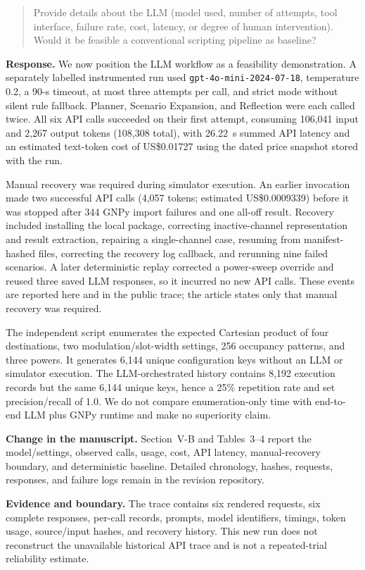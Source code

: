 \documentclass[11pt]{article}
\newenvironment{reviewercomment}{\begin{quote}\color{reviewblue}}{\end{quote}}
\newenvironment{authorresponse}{\color{responsegreen}\textbf{Response.} }{\par\color{black}}
\newcommand{\change}[1]{\par\textbf{Change in the manuscript.} #1\par}
\newcommand{\evidence}[1]{\par\textbf{Evidence and boundary.} #1\par}
\begin{document}
\begin{reviewercomment}
\textbullet{} Provide details about the LLM (model used, number of attempts, tool interface, failure rate, cost, latency, or degree of human intervention). Would it be feasible a conventional scripting pipeline as baseline?
\end{reviewercomment}
\begin{authorresponse}
We now position the LLM workflow as a feasibility demonstration. A separately labelled instrumented run used \texttt{gpt-4o-mini-2024-07-18}, temperature 0.2, a 90-s timeout, at most three attempts per call, and strict mode without silent rule fallback. Planner, Scenario Expansion, and Reflection were each called twice. All six API calls succeeded on their first attempt, consuming 106,041 input and 2,267 output tokens (108,308 total), with 26.22~s summed API latency and an estimated text-token cost of US\$0.01727 using the dated price snapshot stored with the run.

Manual recovery was required during simulator execution. An earlier invocation made two successful API calls (4,057 tokens; estimated US\$0.0009339) before it was stopped after 344 GNPy import failures and one all-off result. Recovery included installing the local package, correcting inactive-channel representation and result extraction, repairing a single-channel case, resuming from manifest-hashed files, correcting the recovery log callback, and rerunning nine failed scenarios. A later deterministic replay corrected a power-sweep override and reused three saved LLM responses, so it incurred no new API calls. These events are reported here and in the public trace; the article states only that manual recovery was required.

The independent script enumerates the expected Cartesian product of four destinations, two modulation/slot-width settings, 256 occupancy patterns, and three powers. It generates 6,144 unique configuration keys without an LLM or simulator execution. The LLM-orchestrated history contains 8,192 execution records but the same 6,144 unique keys, hence a 25\% repetition rate and set precision/recall of 1.0. We do not compare enumeration-only time with end-to-end LLM plus GNPy runtime and make no superiority claim.
\end{authorresponse}
\change{Section~V-B and Tables~3--4 report the model/settings, observed calls, usage, cost, API latency, manual-recovery boundary, and deterministic baseline. Detailed chronology, hashes, requests, responses, and failure logs remain in the revision repository.}
\evidence{The trace contains six rendered requests, six complete responses, per-call records, prompts, model identifiers, timings, token usage, source/input hashes, and recovery history. This new run does not reconstruct the unavailable historical API trace and is not a repeated-trial reliability estimate.}
\end{document}
